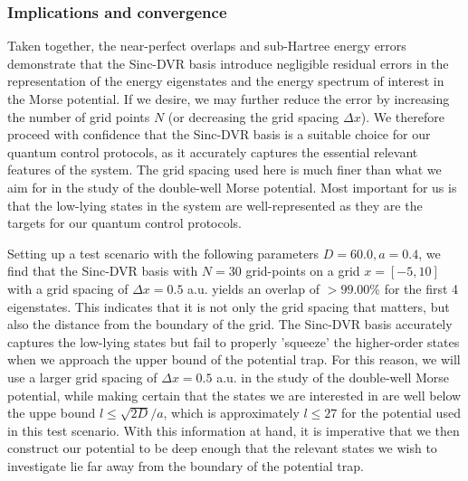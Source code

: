\documentclass{subfiles}
\begin{document}
\subsubsection{Implications and convergence}
Taken together, the near-perfect overlaps and sub-Hartree energy errors demonstrate that the Sinc-DVR basis introduce negligible residual errors in the representation of the energy eigenstates and the energy spectrum of interest in the Morse potential. If we desire, we may further reduce the error by increasing the number of grid points $N$ (or decreasing the grid spacing $\Delta x$). We therefore proceed with confidence that the Sinc-DVR basis is a suitable choice for our quantum control protocols, as it accurately captures the essential relevant features of the system. The grid spacing used here is much finer than what we aim for in the study of the double-well Morse potential. Most important for us is that the low-lying states in the system are well-represented as they are the targets for our quantum control protocols. 

Setting up a test scenario with the following parameters $D = 60.0, a = 0.4$, we find that the Sinc-DVR basis with $N=30$ grid-points on a grid $x = [-5, 10]$ with a grid spacing of $\Delta x = 0.5$ a.u. yields an overlap of $>99.00\%$ for the first 4 eigenstates. This indicates that it is not only the grid spacing that matters, but also the distance from the boundary of the grid. The Sinc-DVR basis accurately captures the low-lying states but fail to properly 'squeeze' the higher-order states when we approach the upper bound of the potential trap. For this reason, we will use a larger grid spacing of $\Delta x = 0.5$ a.u. in the study of the double-well Morse potential, while making certain that the states we are interested in are well below the uppe bound $l \leq \sqrt{2D}/a$, which is approximately $l \leq 27$ for the potential used in this test scenario. With this information at hand, it is imperative that we then construct our potential to be deep enough that the relevant states we wish to investigate lie far away from the boundary of the potential trap.
\end{document}
